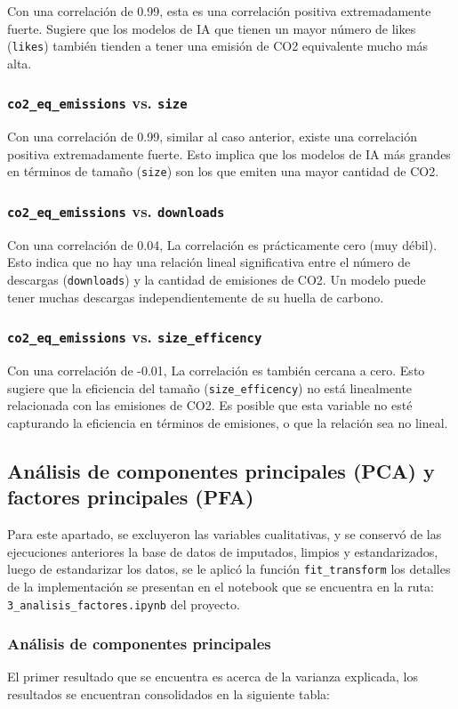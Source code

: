 \documentclass[journal]{IEEEtran}
\begin{document}
	Con una correlación de 0.99, esta es una correlación positiva extremadamente fuerte. Sugiere que los modelos de IA que tienen un mayor número de likes
	(\texttt{likes}) también tienden a tener una emisión de CO2 equivalente mucho más alta.
	\subsubsection{\texttt{co2\_eq\_emissions} vs. \texttt{size}}
	Con una correlación de 0.99, similar al caso anterior, existe una correlación positiva extremadamente fuerte. Esto implica que los modelos de IA más grandes en términos de tamaño (\texttt{size}) son los que emiten una mayor cantidad de CO2.

	\subsubsection{\texttt{co2\_eq\_emissions} vs. \texttt{downloads}}
	Con una correlación de 0.04, La correlación es prácticamente cero (muy débil). Esto indica que no hay una relación lineal significativa entre el número de descargas (\texttt{downloads}) y la cantidad de emisiones de CO2. Un modelo puede tener muchas descargas independientemente de su huella de carbono.

	\subsubsection{\texttt{co2\_eq\_emissions} vs. \texttt{size\_efficency}}
	Con una correlación de -0.01, La correlación es también cercana a cero. Esto sugiere que la eficiencia del tamaño (\texttt{size\_efficency}) no está linealmente relacionada con las emisiones de CO2. Es posible que esta variable no esté capturando la eficiencia en términos de emisiones, o que la relación sea no lineal.

	\subsection{Análisis de componentes principales (PCA) y factores principales (PFA)}
	Para este apartado, se excluyeron las variables cualitativas, y se conservó de las ejecuciones anteriores la base de datos de imputados, limpios y estandarizados, luego de estandarizar los datos, se le aplicó la función \texttt{fit\_transform} los detalles de la implementación se presentan en el notebook que se encuentra en la ruta: \texttt{3\_analisis\_factores.ipynb} del proyecto.
	\subsubsection{Análisis de componentes principales}
	El primer resultado que se encuentra es acerca de la varianza explicada, los resultados se encuentran consolidados en la siguiente tabla:
\end{document}
